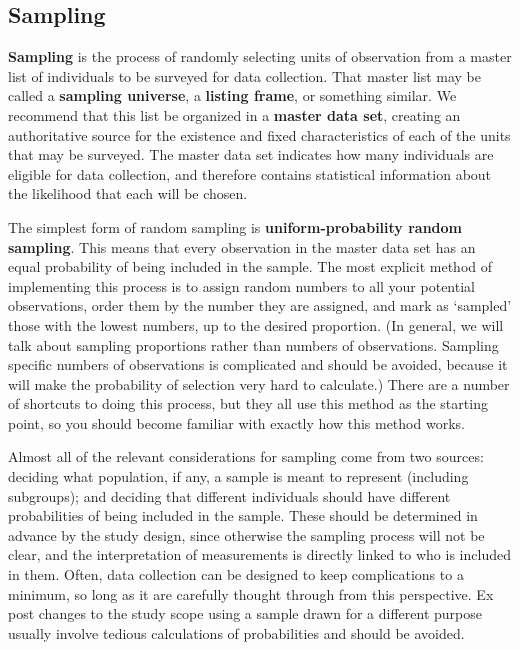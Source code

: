 \subsection{Sampling}

\textbf{Sampling} is the process of randomly selecting units of observation
from a master list of individuals to be surveyed for data collection.
That master list may be called a \textbf{sampling universe}, a \textbf{listing frame}, or something similar.
We recommend that this list be organized in a \textbf{master data set},
creating an authoritative source for the existence and fixed 
characteristics of each of the units that may be surveyed.
The master data set indicates how many individuals are eligible for data collection,
and therefore contains statistical information about the likelihood that each will be chosen.

The simplest form of random sampling is \textbf{uniform-probability random sampling}.
This means that every observation in the master data set
has an equal probability of being included in the sample.
The most explicit method of implementing this process
is to assign random numbers to all your potential observations,
order them by the number they are assigned,
and mark as `sampled' those with the lowest numbers, up to the desired proportion.
(In general, we will talk about sampling proportions rather than numbers of observations.
Sampling specific numbers of observations is complicated and should be avoided,
because it will make the probability of selection very hard to calculate.)
There are a number of shortcuts to doing this process,
but they all use this method as the starting point,
so you should become familiar with exactly how this method works.

Almost all of the relevant considerations for sampling come from two sources:
deciding what population, if any, a sample is meant to represent (including subgroups);
and deciding that different individuals should have different probabilities
of being included in the sample.
These should be determined in advance by the study design,
since otherwise the sampling process will not be clear,
and the interpretation of measurements is directly linked to who is included in them.
Often, data collection can be designed to keep complications to a minimum,
so long as it are carefully thought through from this perspective.
Ex post changes to the study scope using a sample drawn for a different purpose
usually involve tedious calculations of probabilities and should be avoided.

